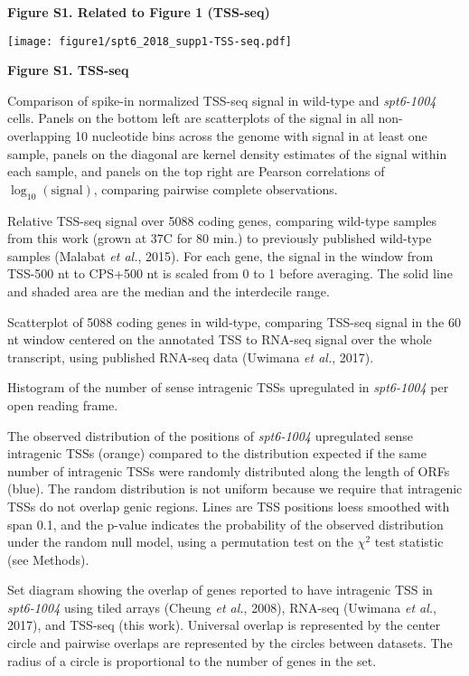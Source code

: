 \documentclass[9pt, letterpaper]{extarticle}
\begin{document}
\textbf{\large Figure S1. Related to Figure 1 (TSS-seq)}

{\centering \texttt{[image: figure1/spt6\_2018\_supp1-TSS-seq.pdf]}\par}

\textbf{Figure S1. TSS-seq}

\begin{description}[noitemsep, topsep=0pt, align=right, labelwidth=12pt, itemindent=0pt, leftmargin=0pt]
	\item [\textbf{(A)}] Comparison of spike-in normalized TSS-seq signal in wild-type and \textit{spt6-1004} cells. Panels on the bottom left are scatterplots of the signal in all non-overlapping 10 nucleotide bins across the genome with signal in at least one sample, panels on the diagonal are kernel density estimates of the signal within each sample, and panels on the top right are Pearson correlations of $\log_{10}\left(\text{signal} \right)$, comparing pairwise complete observations.
	\item [\textbf{(B)}] Relative TSS-seq signal over 5088 coding genes, comparing wild-type samples from this work (grown at 37{\textdegree}C for 80 min.) to previously published wild-type samples (Malabat \textit{et al.}, 2015). For each gene, the signal in the window from TSS-500 nt to CPS+500 nt is scaled from 0 to 1 before averaging. The solid line and shaded area are the median and the interdecile range.
	\item [\textbf{(C)}] Scatterplot of 5088 coding genes in wild-type, comparing TSS-seq signal in the 60 nt window centered on the annotated TSS to RNA-seq signal over the whole transcript, using published RNA-seq data (Uwimana \textit{et al.}, 2017).
	\item [\textbf{(D)}] Histogram of the number of sense intragenic TSSs upregulated in \textit{spt6-1004} per open reading frame.
	\item [\textbf{(E)}] The observed distribution of the positions of \textit{spt6-1004} upregulated sense intragenic TSSs (orange) compared to the distribution expected if the same number of intragenic TSSs were randomly distributed along the length of ORFs (blue). The random distribution is not uniform because we require that intragenic TSSs do not overlap genic regions. Lines are TSS positions loess smoothed with span 0.1, and the p-value indicates the probability of the observed distribution under the random null model, using a permutation test on the $\chi^2$ test statistic (see Methods).
	\item [\textbf{(F)}] Set diagram showing the overlap of genes reported to have intragenic TSS in \textit{spt6-1004} using tiled arrays (Cheung \textit{et al.}, 2008), RNA-seq (Uwimana \textit{et al.}, 2017), and TSS-seq (this work). Universal overlap is represented by the center circle and pairwise overlaps are represented by the circles between datasets. The radius of a circle is proportional to the number of genes in the set.
\end{description}
\end{document}
